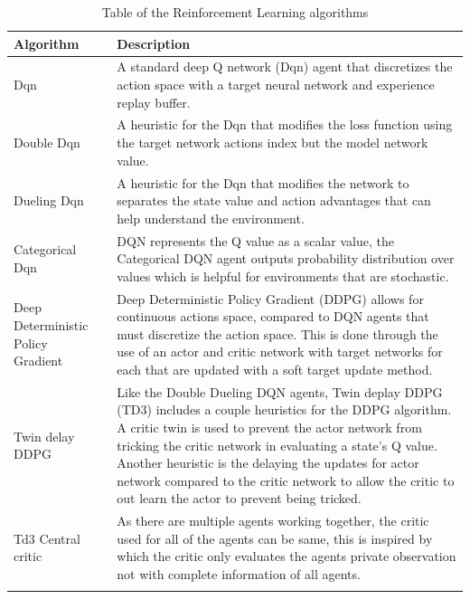 \begin{longtable}{|p{5cm}|p{10cm}|} \hline
    \textbf{Algorithm} & \textbf{Description} \\ \hline
    Dqn~\citep{mnih2015humanlevel} & A standard deep Q network (Dqn) agent that discretizes the action space with a
        target neural network and experience replay buffer. \\ \hline
    Double Dqn~\citep{doubledqn} & A heuristic for the Dqn that modifies the loss function using the target network
        actions index but the model network value. \\ \hline
    Dueling Dqn~\citep{duelingdqn} & A heuristic for the Dqn that modifies the network to separates the state value
        and action advantages that can help understand the environment. \\ \hline
    Categorical Dqn~\citep{distributional_dqn} & DQN represents the Q value as a scalar value, the Categorical DQN agent
        outputs probability distribution over values which is helpful for environments that are stochastic. \\ \hline
    Deep Deterministic Policy Gradient~\citep{ddpg} & Deep Deterministic Policy Gradient (DDPG) allows for continuous
        actions space, compared to DQN agents that must discretize the action space. This is done through the use of an
        actor and critic network with target networks for each that are updated with a soft target update method. \\ \hline
    Twin delay DDPG~\citep{td3} & Like the Double Dueling DQN agents, Twin deplay DDPG (TD3) includes a couple
        heuristics for the DDPG algorithm. A critic twin is used to prevent the actor network from tricking the critic
        network in evaluating a state's Q value. Another heuristic is the delaying the updates for actor network
        compared to the critic network to allow the critic to out learn the actor to prevent being tricked.\\ \hline
    Td3 Central critic & As there are multiple agents working together, the critic used for all of the agents can be
        same, this is inspired by~\cite{maddpg} which the critic only evaluates the agents private observation not with
        complete information of all agents. \\ \hline
    \caption{Table of the Reinforcement Learning algorithms}
    \label{tab:reinforcement_learning_algorithms}
\end{longtable}

